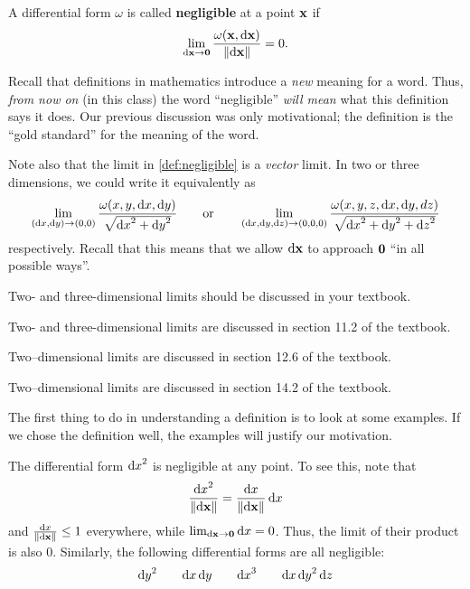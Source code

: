 \begin{defn}\label{def:negligible}
  A differential form $\omega$ is called \textbf{negligible} at a point $\mathbf{x}$ if
  \[ \lim_{{\mathrm{d} \mathbf{x}}\to\mathbf{0}} \frac{\omega(\mathbf{x},{\mathrm{d} \mathbf{x}})}{\Vert {\ensuremath{\mathrm{d} \mathbf{x}}} \Vert} = 0. \]
\end{defn}

Recall that definitions in mathematics introduce a \emph{new} meaning for a word.
Thus, \emph{from now on} (in this class) the word ``negligible'' \emph{will mean} what this definition says it does.
Our previous discussion was only motivational; the definition is the ``gold standard'' for the meaning of the word.

Note also that the limit in \cref{def:negligible} is a \emph{vector} limit.
In two or three dimensions, we could write it equivalently as
\[ \lim_{({\mathrm{d} x},{\mathrm{d} y})\to(0,0)} \frac{\omega(x,y,{\mathrm{d} x},{\mathrm{d} y})}{\sqrt{{\mathrm{d} x}^2+{\mathrm{d} y}^2}} \qquad\text{or}\qquad
\lim_{({\mathrm{d} x},{\mathrm{d} y},{\mathrm{d} z})\to(0,0,0)} \frac{\omega(x,y,z,{\mathrm{d} x},{\mathrm{d} y},dz)}{\sqrt{{\mathrm{d} x}^2+{\mathrm{d} y}^2+{\mathrm{d} z}^2}}
\]
respectively.
Recall that this means that we allow ${\mathrm{d} \mathbf{x}}$ to approach $\mathbf{0}$ ``in all possible ways''.
\begin{notextbook}Two- and three-dimensional limits should be discussed in your textbook.\end{notextbook}%
\begin{stewart}Two- and three-dimensional limits are discussed in section 11.2 of the textbook.\end{stewart}
\begin{hugheshallett}Two--dimensional limits are discussed in section 12.6 of the textbook.\end{hugheshallett}
\begin{rogawski}Two--dimensional limits are discussed in section 14.2 of the textbook.\end{rogawski}
The first thing to do in understanding a definition is to look at some examples.
If we chose the definition well, the examples will justify our motivation.

\begin{eg}
  The differential form ${\mathrm{d} x}^2$ is negligible at any point.
  To see this, note that
  \[ \frac{{\mathrm{d} x}^2}{\Vert {\ensuremath{\mathrm{d} \mathbf{x}}} \Vert} = \frac{{\mathrm{d} x}}{\Vert {\ensuremath{\mathrm{d} \mathbf{x}}} \Vert} \,{\mathrm{d} x} \]
  and $\frac{{\mathrm{d} x}}{\Vert {\ensuremath{\mathrm{d} \mathbf{x}}} \Vert}\le 1$ everywhere, while $\lim_{{\mathrm{d} \mathbf{x}}\to\mathbf{0}} {\mathrm{d} x} = 0$.
  Thus, the limit of their product is also $0$.
  Similarly, the following differential forms are all negligible:
  \[ {\mathrm{d} y}^2 \qquad {\ensuremath{\mathrm{d} x}}\,{\mathrm{d} y} \qquad {\ensuremath{\mathrm{d} x}}^3 \qquad {\ensuremath{\mathrm{d} x}}\,{\mathrm{d} y}^2\,{\mathrm{d} z} \]
\end{eg}

